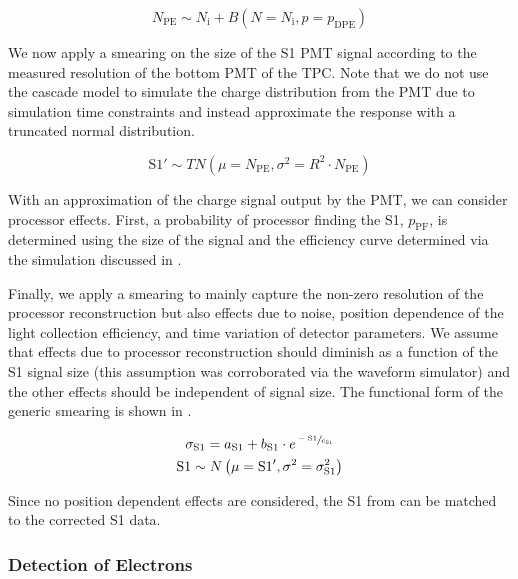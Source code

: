 \begin{equation}
        N_{\textrm{PE}} \sim N_{\textrm{i}} + B(N=N_{\textrm{i}}, p=p_{\textrm{DPE}})
\end{equation}

We now apply a smearing on the size of the S1 PMT signal according to the measured resolution of the bottom PMT of the TPC.  Note that we do not use the cascade model to simulate the charge distribution from the PMT due to simulation time constraints and instead approximate the response with a truncated normal distribution.

\begin{equation}
        \textrm{S1}' \sim TN \left( \mu=N_{\textrm{PE}}, \sigma^2=R^2 \cdot N_{\textrm{PE}} \right)
\end{equation}

With an approximation of the charge signal output by the PMT, we can consider processor effects.  First, a probability of processor finding the S1, $p_{\textrm{PF}}$,  is determined using the size of the signal and the efficiency curve determined via the simulation discussed in .    

Finally, we apply a smearing to mainly capture the non-zero resolution of the processor reconstruction but also effects due to noise, position dependence of the light collection efficiency, and time variation of detector parameters.  We assume that effects due to processor reconstruction should diminish as a function of the S1 signal size (this assumption was corroborated via the waveform simulator) and the other effects should be independent of signal size.  The functional form of the generic smearing is shown in .


\begin{equation}
        \label{eqn:nerix_s1_smearing}
        \begin{gathered}
                \sigma_{\textrm{S1}} = a_{\textrm{S1}} + b_{\textrm{S1}} \cdot e^{\sfrac{-\textrm{S1}}{c_{\textrm{S1}}}} \\
                \textrm{S1} \sim N \left( \mu = \textrm{S1}', \sigma^2  = \sigma_{\textrm{S1}}^2 \right)
        \end{gathered}
\end{equation}

Since no position dependent effects are considered, the S1 from  can be matched to the corrected S1 data.


\subsubsection{Detection of Electrons}


